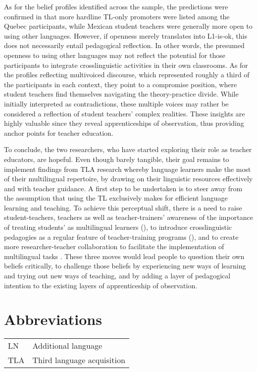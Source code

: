 \documentclass[output=paper]{../langscibook}
\begin{document}
As for the belief profiles identified across the sample, the predictions were confirmed in that more hardline TL-only promoters were listed among the Quebec participants, while Mexican student teachers were generally more open to using other languages. However, if openness merely translates into L1-is-ok, this does not necessarily entail pedagogical reflection. In other words, the presumed openness to using other languages may not reflect the potential for those participants to integrate crosslinguistic activities in their own classrooms. As for the profiles reflecting multivoiced discourse, which represented roughly a third of the participants in each context, they point to a compromise position, where student teachers find themselves navigating the theory-practice divide. While initially interpreted as contradictions, these multiple voices may rather be considered a reflection of student teachers’ complex realities. These insights are highly valuable since they reveal apprenticeships of observation, thus providing anchor points for teacher education.

To conclude, the two researchers, who have started exploring their role as teacher educators, are hopeful. Even though barely tangible, their goal remains to implement findings from TLA research whereby language learners make the most of their multilingual repertoire, by drawing on their linguistic resources effectively and with teacher guidance. A first step to be undertaken is to steer away from the assumption that using the TL exclusively makes for efficient language learning and teaching. To achieve this perceptual shift, there is a need to raise student-teachers, teachers as well as teacher-trainers’ awareness of the importance of treating students’ as multilingual learners (\citealt{ArocenaEgañaEtAl2015}), to introduce crosslinguistic pedagogies as a regular feature of teacher-training programs (\citealt{DeAngelis2011}), and to create more researcher-teacher collaboration to facilitate the implementation of multilingual tasks \citep{GalanteEtAl2020}. These three moves would lead people to question their own beliefs critically, to challenge those beliefs by experiencing new ways of learning and trying out new ways of teaching, and by adding a layer of pedagogical intention to the existing layers of apprenticeship of observation.

\section*{Abbreviations}

\begin{tabular}{@{}ll}
  LN & Additional language \\
TLA & Third language acquisition  
\end{tabular}




\sloppy\printbibliography[heading=subbibliography,notkeyword=this]
\end{document}

